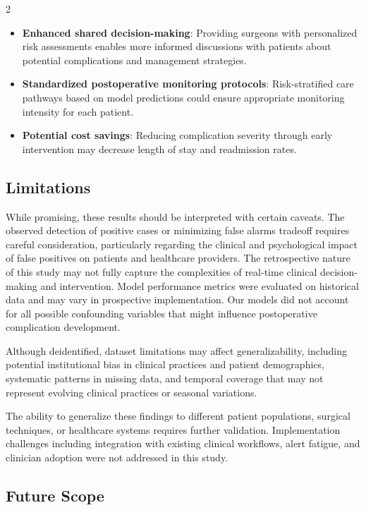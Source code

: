 \documentclass[bst/sn-nature]{sn-jnl}
\begin{document}
\begin{multicols}{2}
\begin{itemize}
    \item \textbf{Enhanced shared decision-making}: Providing surgeons with personalized risk assessments enables more informed discussions with patients about potential complications and management strategies. \\
    
    \item \textbf{Standardized postoperative monitoring protocols}: Risk-stratified care pathways based on model predictions could ensure appropriate monitoring intensity for each patient. \\
    
    \item \textbf{Potential cost savings}: Reducing complication severity through early intervention may decrease length of stay and readmission rates.
\end{itemize}

\subsection{Limitations}

\quad While promising, these results should be interpreted with certain caveats. The observed detection of positive cases or minimizing false alarms tradeoff requires careful consideration, particularly regarding the clinical and psychological impact of false positives on patients and healthcare providers. The retrospective nature of this study may not fully capture the complexities of real-time clinical decision-making and intervention. Model performance metrics were evaluated on historical data and may vary in prospective implementation. Our models did not account for all possible confounding variables that might influence postoperative complication development.

Although deidentified, dataset limitations may affect generalizability, including potential institutional bias in clinical practices and patient demographics, systematic patterns in missing data, and temporal coverage that may not represent evolving clinical practices or seasonal variations.

The ability to generalize these findings to different patient populations, surgical techniques, or healthcare systems requires further validation. Implementation challenges including integration with existing clinical workflows, alert fatigue, and clinician adoption were not addressed in this study.

\subsection{Future Scope}


\end{multicols}
\end{document}
